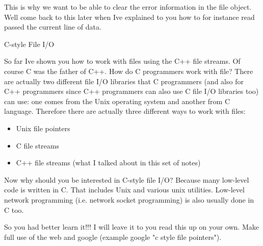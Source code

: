 \documentclass[
]{article}
\providecommand{\tightlist}{%
  \setlength{\itemsep}{0pt}\setlength{\parskip}{0pt}}
\begin{document}
This is why we want to be able to clear the error information in the
file object. We\textquotesingle ll come back to this later when
I\textquotesingle ve explained to you how to for instance read passed
the current line of data.

C-style File I/O

So far I\textquotesingle ve shown you how to work with files using the
C++ file streams. Of course C was the father of C++. How do C
programmers work with file? There are actually two different file I/O
libraries that C programmers (and also for C++ programmers since C++
programmers can also use C file I/O libraries too) can use: one comes
from the Unix operating system and another from C language. Therefore
there are actually three different ways to work with files:

\begin{itemize}
\tightlist
\item
  Unix file pointers
\item
  C file streams
\item
  C++ file streams (what I talked about in this set of notes)
\end{itemize}

Now why should you be interested in C-style file I/O? Because many
low-level code is written in C. That includes Unix and various unix
utilities. Low-level network programming (i.e. network socket
programming) is also usually done in C too.

So you had better learn it!!! I will leave it to you read this up on
your own. Make full use of the web and google (example google "c style
file pointers").
\end{document}
